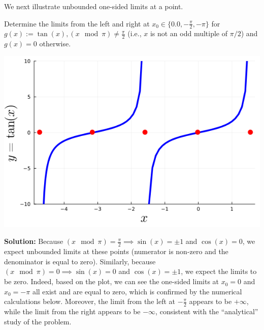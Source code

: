 \bigskip

We next illustrate unbounded one-sided limits at a point.

\bigskip

\begin{example} 
\label{ex:LimitsTangentOfx}
Determine the limits from the left and right at $x_0 \in \{ 0.0,  -\frac{\pi}{2},  -\pi\}$ for $g(x):= \tan(x), (x \mod \pi ) \neq  \frac{\pi}{2}$ (i.e., $x$ is not an odd multiple of $\pi/2$) and $g(x)=0$ otherwise. 
\end{example}

    \begin{center}
    \includegraphics[width=0.45\columnwidth]{graphics/Chap04/LeftRightLimitTangent.png}
    \end{center}
    
\textbf{Solution:}
Because $(x \mod \pi ) = \frac{\pi}{2} \implies \sin(x)= \pm 1$ and $\cos(x) = 0$, we expect unbounded limits at these points (numerator is non-zero and the denominator is equal to zero). Similarly, because $(x \mod \pi ) = 0 \implies \sin(x)= 0$ and $\cos(x) = \pm 1$, we expect the limits to be zero. Indeed, based on the plot, we can see the one-sided limits at $x_0=0$ and $x_0 = -\pi$ all exist and are equal to zero, which is confirmed by the numerical calculations below. Moreover, the limit from the left at $-\frac{\pi}{2}$ appears to be $+\infty$, while the limit from the right appears to be $-\infty$, consistent with the ``analytical'' study of the problem. 


